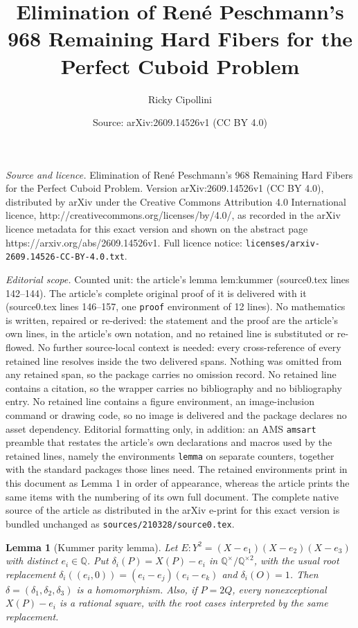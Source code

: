\documentclass[10pt,a4paper]{amsart}
\title{Elimination of Ren\'e Peschmann's 968 Remaining Hard Fibers for the Perfect Cuboid Problem}
\author{Ricky Cipollini}
\date{Source: arXiv:2609.14526v1 (CC BY 4.0)}
\newtheorem{lemma}{Lemma}
\newcommand{\Q}{\mathbb Q}
\begin{document}
\maketitle

\noindent\emph{Source and licence.} Elimination of Ren\'e Peschmann's 968 Remaining Hard Fibers for the Perfect Cuboid Problem. Version arXiv:2609.14526v1 (CC BY 4.0), distributed by arXiv under the Creative Commons Attribution 4.0 International licence, http://creativecommons.org/licenses/by/4.0/, as recorded in the arXiv licence metadata for this exact version and shown on the abstract page https://arxiv.org/abs/2609.14526v1. Full licence notice: \texttt{licenses/arxiv-2609.14526-CC-BY-4.0.txt}.\par\smallskip

\noindent\textit{Editorial scope.} Counted unit: the article's lemma lem:kummer (source0.tex lines 142--144). The article's complete original proof of it is delivered with it (source0.tex lines 146--157, one \texttt{proof} environment of 12 lines). No mathematics is written, repaired or re-derived: the statement and the proof are the article's own lines, in the article's own notation, and no retained line is substituted or re-flowed.  No further source-local context is needed: every cross-reference of every retained line resolves inside the two delivered spans.  Nothing was omitted from any retained span, so the package carries no omission record.  No retained line contains a citation, so the wrapper carries no bibliography and no bibliography entry.  No retained line contains a figure environment, an image-inclusion command or drawing code, so no image is delivered and the package declares no asset dependency.  Editorial formatting only, in addition: an AMS \texttt{amsart} preamble that restates the article's own declarations and macros used by the retained lines, namely the environments \texttt{lemma} on separate counters, together with the standard packages those lines need.  The retained environments print in this document as Lemma 1 in order of appearance, whereas the article prints the same items with the numbering of its own full document.  The complete native source of the article as distributed in the arXiv e-print for this exact version is bundled unchanged as \texttt{sources/210328/source0.tex}.
\begin{lemma}[Kummer parity lemma]\label{lem:kummer}
Let $E:Y^2=(X-e_1)(X-e_2)(X-e_3)$ with distinct $e_i\in\Q$. Put $\delta_i(P)=X(P)-e_i$ in $\Q^\times/\Q^{\times2}$, with the usual root replacement $\delta_i((e_i,0))=(e_i-e_j)(e_i-e_k)$ and $\delta_i(O)=1$. Then $\delta=(\delta_1,\delta_2,\delta_3)$ is a homomorphism. Also, if $P=2Q$, every nonexceptional $X(P)-e_i$ is a rational square, with the root cases interpreted by the same replacement.
\end{lemma}
\end{document}
